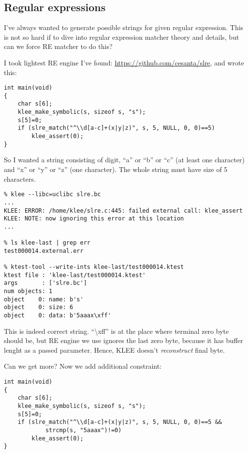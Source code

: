 \subsection{Regular expressions}

I've always wanted to generate possible strings for given regular expression.
This is not so hard if to dive into regular expression matcher theory and details, but can we force RE matcher to do this?

I took lightest RE engine I've found: \url{https://github.com/cesanta/slre}, and wrote this:

\begin{lstlisting}
int main(void)
{
	char s[6];
	klee_make_symbolic(s, sizeof s, "s");
	s[5]=0;
	if (slre_match("^\\d[a-c]+(x|y|z)", s, 5, NULL, 0, 0)==5)
		klee_assert(0);
}
\end{lstlisting}

So I wanted a string consisting of digit, ``a'' or ``b'' or ``c'' (at least one character) and ``x'' or ``y'' or ``z'' (one character).
The whole string must have size of 5 characters.

\begin{lstlisting}
% klee --libc=uclibc slre.bc
...
KLEE: ERROR: /home/klee/slre.c:445: failed external call: klee_assert
KLEE: NOTE: now ignoring this error at this location
...

% ls klee-last | grep err
test000014.external.err

% ktest-tool --write-ints klee-last/test000014.ktest
ktest file : 'klee-last/test000014.ktest'
args       : ['slre.bc']
num objects: 1
object    0: name: b's'
object    0: size: 6
object    0: data: b'5aaax\xff'
\end{lstlisting}

This is indeed correct string. ``\textbackslash{}xff'' is at the place where terminal zero byte should be, but RE engine we use ignores the last zero byte, because it has buffer lenght as a passed parameter.
Hence, KLEE doesn't \textit{reconstruct} final byte.

Can we get more?
Now we add additional constraint:

\begin{lstlisting}
int main(void)
{
	char s[6];
	klee_make_symbolic(s, sizeof s, "s");
	s[5]=0;
	if (slre_match("^\\d[a-c]+(x|y|z)", s, 5, NULL, 0, 0)==5 &&
			strcmp(s, "5aaax")!=0)
		klee_assert(0);
}
\end{lstlisting}

